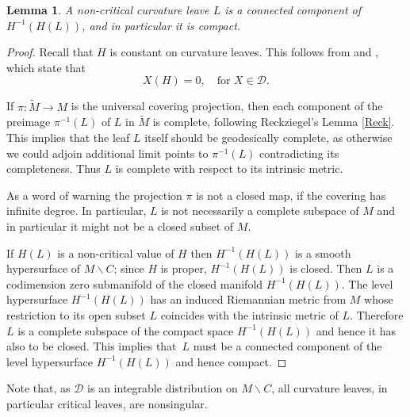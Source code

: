 \documentclass[10pt]{amsart}
\let\mathcal\mathscr
\let\moins\smallsetminus
\newtheorem{lemma}[theorem]{Lemma}
\theoremstyle{definition}
\theoremstyle{remark}
\numberwithin{equation}{section}
\begin{document}
\begin{lemma}\label{noncritical}
A non-critical curvature leave $L$ is a connected component of
$H^{-1}(H(L))$, and in particular it is compact.
\end{lemma}
\begin{proof}
Recall that $H$ is constant on curvature leaves. This follows from \cite[(3.5)]{BP} and \cite[(3.4-3.5)(i)]{GM}, which state that
\[ X(H)=0, \quad\text{for }X\in \mathcal D.\]

If $\pi:\widetilde{M}\to M$ is the universal covering projection, then
each component of the preimage $\pi^{-1}(L)$ of $L$
in $\widetilde{M}$ is complete, following Reckziegel's Lemma \ref{Reck}.
This implies that the leaf $L$ itself should be
geodesically complete, as otherwise
we could adjoin additional limit points to $\pi^{-1}(L)$ contradicting
its completeness. Thus $L$ is complete with respect to its
intrinsic metric.

As a word of warning the projection $\pi$ is not a closed map, if
the covering has infinite degree. In particular, $L$ is not necessarily
a complete subspace of $M$ and in particular
it might not be a closed subset of $M$.

If $H(L)$ is a non-critical value of $H$ then $H^{-1}(H(L))$ is a smooth hypersurface of $M\moins C$; since $H$ is proper,
$H^{-1}(H(L))$ is closed. Then $L$ is a codimension zero
submanifold of the closed manifold $H^{-1}(H(L))$. The level hypersurface
$H^{-1}(H(L))$ has an induced Riemannian metric from $M$ whose restriction
to its open subset $L$ coincides with the intrinsic metric of $L$.
Therefore $L$ is a complete subspace of the compact space
$H^{-1}(H(L))$ and hence it has also to be closed.
This implies that~$L$ must be a connected component
of the level hypersurface $H^{-1}(H(L))$ and hence compact.
\end{proof}

Note that, as $\mathcal D$ is an integrable distribution on $M\moins C$,
all curvature leaves, in particular critical leaves, are nonsingular.
\end{document}
